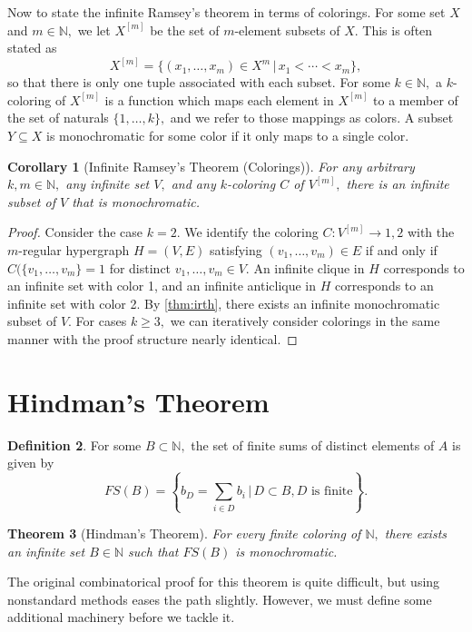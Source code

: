 \documentclass[12pt]{amsart}
\newcommand{\NN}{\mathbb{N}}
\theoremstyle{plain}
\newtheorem{thm}{Theorem}
\newtheorem{cor}[thm]{Corollary}
\theoremstyle{definition}
\newtheorem{defn}[thm]{Definition}
\theoremstyle{remark}
\theoremstyle{theorem}
\numberwithin{equation}{section}
\numberwithin{thm}{section}
\begin{document}
Now to state the infinite Ramsey's theorem in terms of colorings. For some set $X$ and $m \in \NN,$ we let $X^{[m]}$ be the set of $m$-element subsets of $X.$ This is often stated as 
\[X^{[m]}= \{(x_1, \ldots , x_m) \in X^m \, | \, x_1 < \cdots < x_m \},\] so that there is only one tuple associated with each subset. For some $k \in \NN,$ a $k$-coloring of $X^[m]$ is a function which maps each element in $X^{[m]}$ to a member of the set of naturals $\{1, \ldots , k\},$ and we refer to those mappings as colors. A subset $Y \subseteq X$ is monochromatic for some color if it only maps to a single color. 
\begin{cor}[Infinite Ramsey's Theorem (Colorings)]
\label{thm:irtc} For any arbitrary $k, m \in \NN,$ any infinite set $V,$ and any $k$-coloring $C$ of $V^{[m]},$ there is an infinite subset of $V$ that is monochromatic.
\end{cor}
\begin{proof}
Consider the case $k=2.$ We identify the coloring $C: V^{[m]} \rightarrow {1,2}$ with the $m$-regular hypergraph $H = (V,E)$ satisfying $(v_1, \ldots , v_m) \in E$ if and only if $C(\{v_1, \ldots , v_m \}=1$ for distinct $v_1, \ldots, v_m \in V.$ An infinite clique in $H$ corresponds to an infinite set with color 1, and an infinite anticlique in $H$ corresponds to an infinite set with color 2. By \ref{thm:irth}, there exists an infinite monochromatic subset of $V.$ For cases $k \geq 3,$ we can iteratively consider colorings in the same manner with the proof structure nearly identical.
\end{proof}
\section{Hindman's Theorem}
\begin{defn}
For some $B \subset \NN,$ the set of finite sums of distinct elements of $A$ is given by 
\[FS(B) =\left \{ b_D = \sum_{i \in D}b_i \, | \, D \subset B, D \text{ is finite}\right \}. \]
\end{defn}
\begin{thm}[Hindman's Theorem]
\label{thm:hindman} For every finite coloring of $\NN,$ there exists an infinite set $B \in \NN$ such that $FS(B)$ is monochromatic.
\end{thm}
The original combinatorical proof for this theorem is quite difficult, but using nonstandard methods eases the path slightly. However, we must define some additional machinery before we tackle it. 
\end{document}
